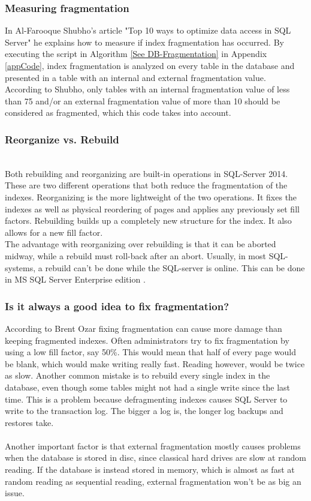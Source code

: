 \documentclass{cslthse-msc}
\begin{document}
\subsubsection{Measuring fragmentation} \label{measurefrag}
In Al-Farooque Shubho's article "Top 10 ways to optimize data access in SQL Server"   \cite{Shubho09} he explains how to measure if index fragmentation has occurred. By executing the script in Algorithm \ref{See DB-Fragmentation} in Appendix \ref{appCode}, index fragmentation is analyzed on every table in the database and presented in a table with an internal and external fragmentation value. \\

According to Shubho, only tables with an internal fragmentation value of less than 75 and/or an external fragmentation value of more than 10 should be considered as fragmented, which this code takes into account.

\subsubsection{Reorganize vs. Rebuild}\mbox{}\\
Both rebuilding and reorganizing are built-in operations in SQL-Server 2014. These are two different operations that both reduce the fragmentation of the indexes. Reorganizing is the more lightweight of the two operations. It fixes the indexes as well as physical reordering of pages and applies any previously set fill factors. Rebuilding builds up a completely new structure for the index. It also allows for a new fill factor.\\
The advantage with reorganizing over rebuilding is that it can be aborted midway, while a rebuild must roll-back after an abort. Usually, in most SQL-systems, a rebuild can't be done while the SQL-server is online. This can be done in MS SQL Server Enterprise edition   \cite{Little13}.

\subsubsection{Is it always a good idea to fix fragmentation?}
According to Brent Ozar   \cite{Ozar12} fixing fragmentation can cause more damage than keeping fragmented indexes. Often administrators try to fix fragmentation by using a low fill factor, say 50\%. This would mean that half of every page would be blank, which would make writing really fast. Reading however, would be twice as slow. Another common mistake is to rebuild every single index in the database, even though some tables might not had a single write since the last time. This is a problem because defragmenting indexes causes SQL Server to write to the transaction log. The bigger a log is, the longer log backups and restores take.\\\\
Another important factor is that external fragmentation mostly causes problems when the database is stored in disc, since classical hard drives are slow at random reading. If the database is instead stored in memory, which is almost as fast at random reading as sequential reading, external fragmentation won't be as big an issue.
\end{document}
